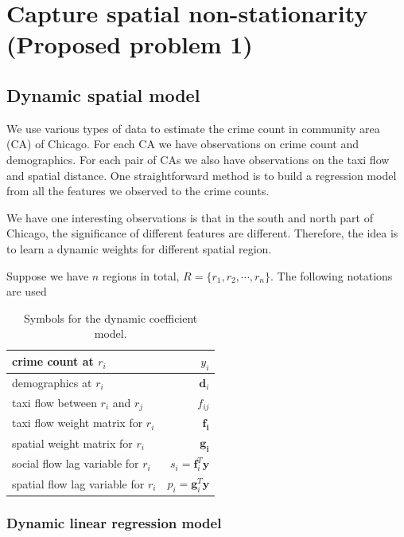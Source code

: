 \section{Capture spatial non-stationarity (Proposed problem 1)}




\subsection{Dynamic spatial model}


We use various types of data to estimate the crime count in community area (CA) of Chicago. For each CA we have observations on crime count and demographics. For each pair of CAs we also have observations on the taxi flow and spatial distance. One straightforward method is to build a regression model from all the features we observed to the crime counts.

We have one interesting observations is that in the south and north part of Chicago, the significance of different features are different. Therefore, the idea is to learn a dynamic weights for different spatial region.



Suppose we have $n$ regions in total, $R = \{ r_1, r_2, \cdots, r_n \}$.
The following notations are used

\begin{table}[h]
\centering
\begin{tabular}{|l|r|}
\hline
crime count at $r_i$ & $y_i$ \\ \hline
demographics at $r_i$ & $\mathbf{d}_i$ \\ \hline
taxi flow between $r_i$ and $r_j$ & $f_{ij}$ \\ \hline
taxi flow weight matrix for $r_i$ & $\mathbf{f_i}$ \\ \hline
spatial weight matrix for $r_i$ & $\mathbf{g_i}$ \\ \hline
social flow lag variable for $r_i$ & $s_i = \mathbf{f}_i^T \mathbf{y}$ \\\hline
spatial flow lag variable for $r_i$ & $p_i = \mathbf{g}_i^T \mathbf{y}$ \\\hline
\end{tabular}
\caption{Symbols for the dynamic coefficient model.}
\end{table}


\subsubsection{Dynamic linear regression model}



